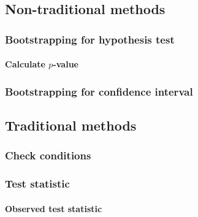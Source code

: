 \documentclass[12pt, krantz2,]{krantz}
\let\oldparagraph\paragraph
\renewcommand{\paragraph}[1]{\oldparagraph{#1}\mbox{}}
\begin{document}
\hypertarget{non-traditional-methods-4}{%
\subsection{Non-traditional methods}\label{non-traditional-methods-4}}

\hypertarget{bootstrapping-for-hypothesis-test-1}{%
\subsubsection*{Bootstrapping for hypothesis test}\label{bootstrapping-for-hypothesis-test-1}}


\hypertarget{calculate-p-value-4}{%
\paragraph{\texorpdfstring{Calculate \(p\)-value}{Calculate p-value}}\label{calculate-p-value-4}}

\hypertarget{bootstrapping-for-confidence-interval-4}{%
\subsubsection*{Bootstrapping for confidence interval}\label{bootstrapping-for-confidence-interval-4}}


\hypertarget{traditional-methods-4}{%
\subsection{Traditional methods}\label{traditional-methods-4}}

\hypertarget{check-conditions-4}{%
\subsubsection*{Check conditions}\label{check-conditions-4}}


\hypertarget{test-statistic-4}{%
\subsubsection*{Test statistic}\label{test-statistic-4}}


\hypertarget{observed-test-statistic-4}{%
\paragraph{Observed test statistic}\label{observed-test-statistic-4}}
\end{document}

